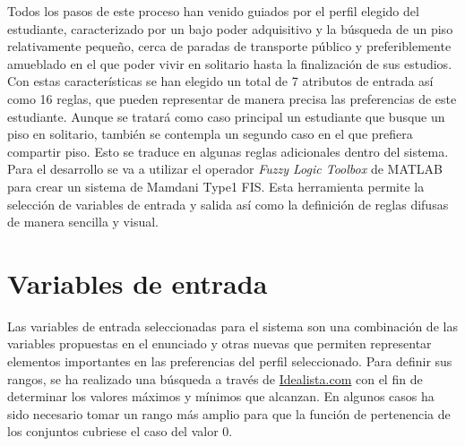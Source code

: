 \documentclass[12pt]{report} %
\begin{document}
        Todos los pasos de este proceso han venido guiados por el perfil
        elegido del estudiante, caracterizado por un bajo poder adquisitivo y
        la búsqueda de un piso relativamente pequeño, cerca de paradas de
        transporte público y preferiblemente amueblado en el que poder vivir en
        solitario hasta la finalización de sus estudios. Con estas
        características se han elegido un total de 7 atributos de entrada así
        como 16 reglas, que pueden representar de manera precisa las
        preferencias de este estudiante. Aunque se tratará como caso principal
        un estudiante que busque un piso en solitario, también se contempla un
        segundo caso en el que prefiera compartir piso. Esto se traduce en
        algunas reglas adicionales dentro del sistema. Para el desarrollo se
        va a utilizar el operador \textit{Fuzzy Logic Toolbox} de MATLAB para
        crear un sistema de Mamdani Type1 FIS. Esta herramienta permite la
        selección de variables de entrada y salida así como la definición de
        reglas difusas de manera sencilla y visual.

    \section{Variables de entrada}

        Las variables de entrada seleccionadas para el sistema son una
        combinación de las variables propuestas en el enunciado y otras nuevas
        que permiten representar elementos importantes en las preferencias del
        perfil seleccionado. Para definir sus rangos, se ha realizado una
        búsqueda a través de \href{https://www.idealista.com/}{Idealista.com}
        con el fin de determinar los valores máximos y mínimos que alcanzan. En
        algunos casos ha sido necesario tomar un rango más amplio para que la
        función de pertenencia de los conjuntos cubriese el caso del valor 0.

\end{document}

